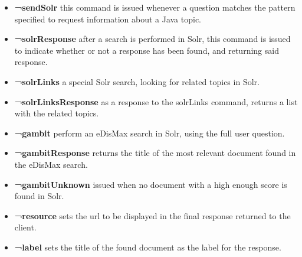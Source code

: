 \begin{itemize}
 \item \textbf{¬sendSolr} this command is issued whenever a question matches the pattern specified to request information about a Java topic.
 \item \textbf{¬solrResponse} after a search is performed in Solr, this command is issued to indicate whether or not a response has been found, and returning said response.
 \item \textbf{¬solrLinks} a special Solr search, looking for related topics in Solr.
 \item \textbf{¬solrLinksResponse} as a response to the solrLinks command, returns a list with the related topics.
 \item \textbf{¬gambit} perform an eDisMax search in Solr, using the full user question.
 \item \textbf{¬gambitResponse} returns the title of the most relevant document found in the eDisMax search.
 \item \textbf{¬gambitUnknown} issued when no document with a high enough score is found in Solr.
 \item \textbf{¬resource} sets the url to be displayed in the final response returned to the client.
 \item \textbf{¬label} sets the title of the found document as the label for the response.
\end{itemize}

